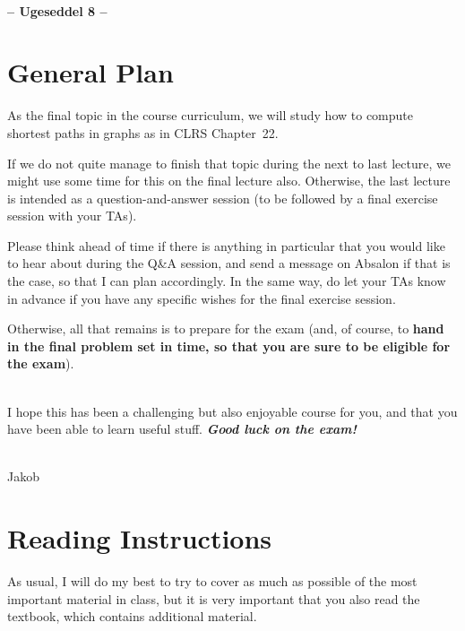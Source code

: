 \documentclass[12pt,a4paper]{article}
\theoremstyle{plain}
\theoremstyle{definition}
\begin{document}
\begin{center}
\textbf{\large \coursenameshort \\[0.5em] -- Ugeseddel 8 -- \\[0.5em]}
\end{center}
\noindent

\section*{General Plan}

As the final topic in the course curriculum, we will study how to compute shortest paths in graphs as in CLRS Chapter~22.

If we do not quite manage to finish that topic during the next to last
lecture, we might use some time for this on the final lecture also.
Otherwise, the last lecture is intended as a 
question-and-answer session
(to be followed by a final exercise session with your TAs).

Please think ahead of time if there is anything in particular that you
would like to hear about during the Q\&A session, and send a message
on Absalon if that is the case, so that I can plan accordingly.  In
the same way, do let your TAs know in advance if you have any specific
wishes for the final exercise session.

Otherwise, all that remains is to prepare for the exam
(and, of course, to
\textbf{hand in the final problem set in time, so that
you are sure to be eligible for the exam}).


\mbox{ } \\
\noindent
I hope this has been a challenging but
also enjoyable course for you, 
and that you have been able to learn useful stuff.
\textbf{\textit{Good luck on the exam!}}

\mbox{ } \\
\noindent
Jakob

\section*{Reading Instructions}

As usual, I will do my best to try to cover as much as possible of the
most important material in class, but it is very important that you
also read the textbook, which contains additional material.
\end{document}
